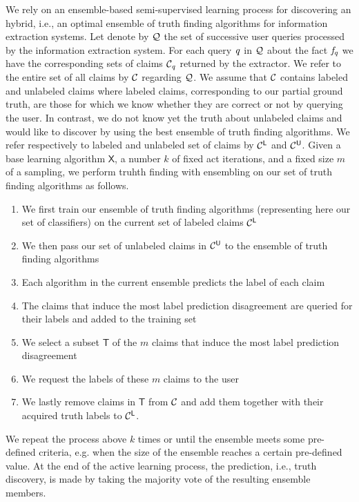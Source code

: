 \medskip

We rely on an ensemble-based semi-supervised learning process for discovering an hybrid, i.e., an optimal ensemble of truth
finding algorithms for information extraction systems. Let denote by $\mathcal{Q}$ the set of successive user queries processed 
by the information extraction system. For each query $\mathit{q}$ in $\mathcal{Q}$ about the fact $\mathit{f}_{\mathit{q}}$ we have the corresponding
sets of claims $\mathcal{C}_{\mathit{q}}$ returned by the extractor. We refer to the entire set of all claims by $\mathcal{C}$ regarding $\mathcal{Q}$.
We assume that $\mathcal{C}$ contains labeled and unlabeled claims where labeled claims, corresponding to our partial ground truth, are those 
for which we  know whether they are correct or not by querying the user. In contrast, we do not know yet the truth about unlabeled claims and
would like to discover by using the best ensemble of truth finding algorithms. We refer respectively to labeled and unlabeled set of claims by 
$\mathcal{C}^{\mathsf{L}}$ and $\mathcal{C}^{\mathsf{U}}$. Given a base learning algorithm $\mathsf{X}$, a number $k$ of fixed act iterations, and 
a fixed size $m$ of a sampling, we perform truhth finding with ensembling on our set of truth finding algorithms as follows.

\begin{enumerate}
 \item We first train our ensemble of truth finding algorithms (representing here our set of classifiers)  on the current set of labeled claims
 $\mathcal{C}^{\mathsf{L}}$ 
 \item We then pass our set of unlabeled claims in $\mathcal{C}^{\mathsf{U}}$ to the ensemble of truth finding algorithms
 \item Each algorithm in the current ensemble predicts the label of each claim
 \item The claims that induce the most label prediction disagreement are queried for their labels and added to the training set
 \item We select a subset $\mathsf{T}$ of the $m$ claims that induce the most label prediction disagreement
 \item We request the labels of these $m$ claims to the user 
 \item We lastly remove claims in $\mathsf{T}$ from $\mathcal{C}$ and add them together with their acquired truth labels to $\mathcal{C}^{\mathsf{L}}$.
\end{enumerate}

We repeat the process above $k$ times or until the ensemble meets some pre-defined criteria, e.g. when the size of the ensemble
reaches a certain pre-defined value. At the end of the active learning process, the prediction, i.e., truth discovery, is made 
by taking the majority vote of the resulting ensemble members. 
